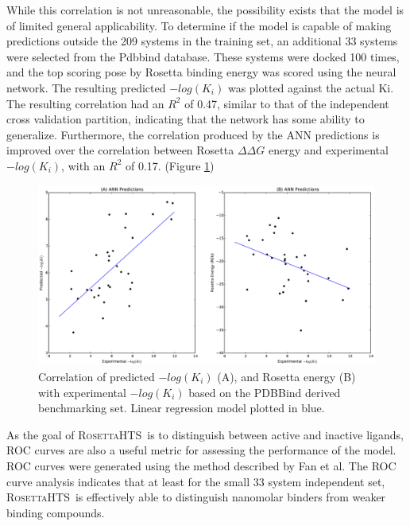 \documentclass[11pt, oneside]{article}   	%
\newcommand{\rhts}{\textsc{RosettaHTS}\ }
\begin{document}
While this correlation is not unreasonable, the possibility exists that the model is of limited general applicability.  
To determine if the model is capable of making predictions outside the 209 systems in the training set, an additional 33 systems were selected from the Pdbbind database.  
These systems were docked 100 times, and the top scoring pose by Rosetta binding energy was scored using the neural network.
The resulting predicted $-log(K_{i})$ was plotted against the actual Ki.
The resulting correlation had an $R^{2}$ of 0.47, similar to that of the independent cross validation partition, indicating that the network has some ability to generalize.
Furthermore, the correlation produced by the ANN predictions is improved over the correlation between Rosetta $\Delta\Delta G$ energy and experimental $-log(K_{i})$, with an $R^{2}$ of 0.17. (Figure \ref{fig:indepval})
\begin{figure}[htbp]
   \includegraphics[width=1.0\textwidth]{figures/independent_correlation.pdf} %
   \caption{Correlation of predicted $-log(K_{i})$ (A), and Rosetta energy (B) with experimental $-log(K_{i})$  based on the PDBBind derived benchmarking set. Linear regression model plotted in blue.}
   \label{fig:indepval}
\end{figure}

As the goal of \rhts is to distinguish between active and inactive ligands, ROC curves are also a useful metric for assessing the performance of the model.
ROC curves were generated using the method described by Fan et al. \citep{Fan:2009kh}
The ROC curve analysis indicates that at least for the small 33 system independent set, \rhts is effectively able to distinguish nanomolar binders from weaker binding compounds.
\end{document}
